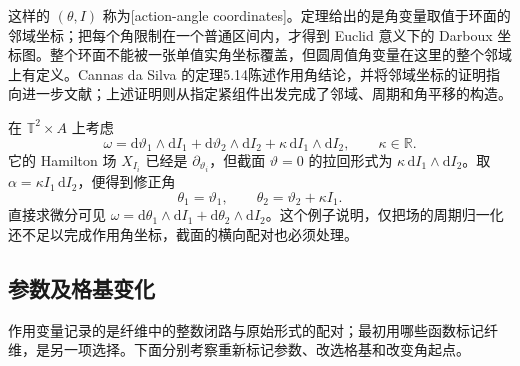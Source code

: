 这样的 \((\theta,I)\) 称为[action-angle coordinates]。定理给出的是角变量取值于环面的邻域坐标；把每个角限制在一个普通区间内，才得到 Euclid 意义下的 Darboux 坐标图。整个环面不能被一张单值实角坐标覆盖，但圆周值角变量在这里的整个邻域上有定义。Cannas da Silva 的定理5.14陈述作用角结论，并将邻域坐标的证明指向进一步文献；上述证明则从指定紧组件出发完成了邻域、周期和角平移的构造。\cite[第5.5节，定理5.14，第152--153页]{Cannas2006Symplectic}

\begin{example}\label{g4:exm:1102:base-form-correction}
	在 \(\mathbb T^2\times A\) 上考虑
	\[
		\omega=\mathrm{d}\vartheta_1\wedge\mathrm{d}I_1
		+\mathrm{d}\vartheta_2\wedge\mathrm{d}I_2
		+\kappa\,\mathrm{d}I_1\wedge\mathrm{d}I_2,
		\qquad \kappa\in\mathbb R.
	\]
	它的 Hamilton 场 \(X_{I_i}\) 已经是 \(\partial_{\vartheta_i}\)，但截面 \(\vartheta=0\) 的拉回形式为
	\(\kappa\,\mathrm{d}I_1\wedge\mathrm{d}I_2\)。取
	\(\alpha=\kappa I_1\,\mathrm{d}I_2\)，便得到修正角
	\[
		\theta_1=\vartheta_1,\qquad
		\theta_2=\vartheta_2+\kappa I_1.
	\]
	直接求微分可见 \(\omega=\mathrm{d}\theta_1\wedge\mathrm{d}I_1+
	\mathrm{d}\theta_2\wedge\mathrm{d}I_2\)。这个例子说明，仅把场的周期归一化还不足以完成作用角坐标，截面的横向配对也必须处理。
\end{example}

\subsection{参数及格基变化}
\label{g4:subsec:1102:05}

作用变量记录的是纤维中的整数闭路与原始形式的配对；最初用哪些函数标记纤维，是另一项选择。下面分别考察重新标记参数、改选格基和改变角起点。

